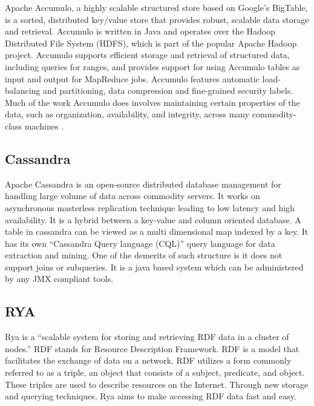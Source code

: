      Apache Accumulo, a highly scalable structured store based on
     Google’s BigTable, is a sorted, distributed key/value store that
     provides robust, scalable data storage and retrieval. Accumulo is
     written in Java and operates over the Hadoop Distributed File
     System (HDFS), which is part of the popular Apache Hadoop
     project. Accumulo supports efficient storage and retrieval of
     structured data, including queries for ranges, and provides
     support for using Accumulo tables as input and output for
     MapReduce jobs.
     Accumulo features automatic load-balancing and
     partitioning, data compression and fine-grained security
     labels. Much of the work Accumulo does involves maintaining
     certain properties of the data, such as organization,
     availability, and integrity, across many commodity-class
     machines \cite{apache-accumulo}.

\subsection{Cassandra}

     Apache Cassandra \cite{www-cassandra} is an open-source
     distributed database management for handling large volume of
     data across commodity servers. It works on asynchronous
     masterless replication technique leading to low latency and high
     availability. It is a hybrid between a key-value and column
     oriented database. A table in cassandra can be viewed as a multi
     dimensional map indexed by a key. It has its own ``Cassandra Query
     language (CQL)'' query language for data extraction and
     mining. One of the demerits of such structure is it does not
     support joins or subqueries. It is a java based system which can
     be administered by any JMX compliant tools.

\subsection{RYA}

     Rya is a ``scalable system for storing and retrieving RDF data in
     a cluster of nodes.'' \cite{Punnoose} RDF stands for Resource
     Description Framework. \cite{Punnoose} RDF is a model that
     facilitates the exchange of data on a network. \cite{w3} RDF
     utilizes a form commonly referred to as a triple, an object that
     consists of a subject, predicate, and object. \cite{Punnoose}
     These triples are used to describe resources on the
     Internet. \cite{Punnoose} Through new storage and querying
     techniques, Rya aims to make accessing RDF data fast and
     easy. \cite{apacherya}
     
